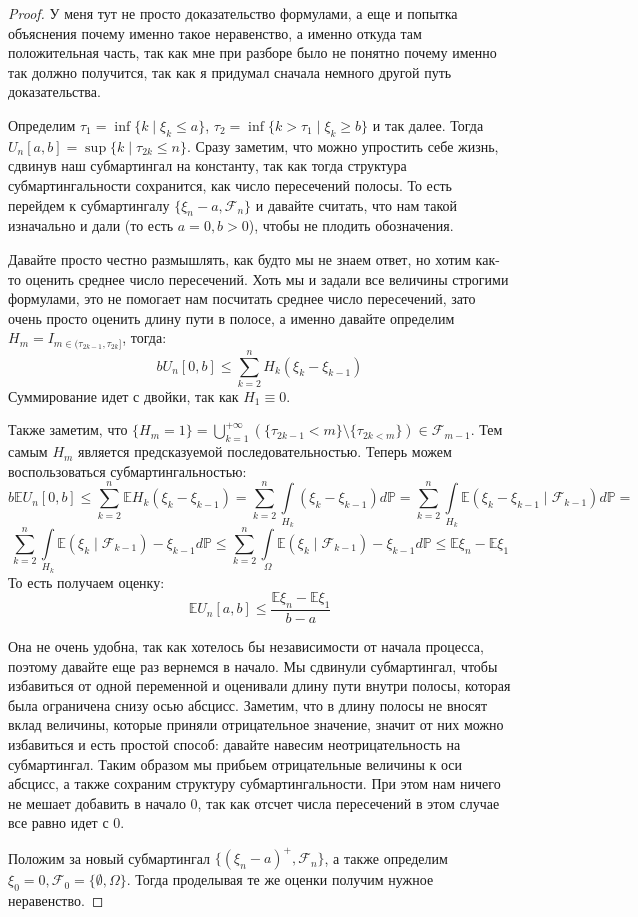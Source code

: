 \documentclass[12pt,a4paper]{article} %
\newcommand{\E}{\mathbb{E}}
\newcommand{\PR}{\mathbb{P}}
\newcommand{\F}{\mathcal{F}}
\begin{document}
	\begin{proof}
		У меня тут не просто доказательство формулами, а еще и попытка объяснения почему именно такое неравенство, а именно откуда там положительная часть, так как мне при разборе было не понятно почему именно так должно получится, так как я придумал сначала немного другой путь доказательства.
		
		Определим $\tau_1=\inf\{k\mid\xi_k\leq a\}$, $\tau_2=\inf\{k>\tau_1\mid\xi_k\geq b\}$ и так далее. Тогда $U_n[a,b]=\sup\{k\mid\tau_{2k}\leq n\}$. Сразу заметим, что можно упростить себе жизнь, сдвинув наш субмартингал на константу, так как тогда структура субмартингальности сохранится, как  число пересечений полосы. То есть перейдем к субмартингалу $\{\xi_n-a,\F_n\}$ и давайте считать, что нам такой изначально и дали (то есть $a=0, b>0$), чтобы не плодить обозначения.
		
		Давайте просто честно размышлять, как будто мы не знаем ответ, но хотим как-то оценить среднее число пересечений. Хоть мы и задали все величины строгими формулами, это не помогает нам посчитать среднее число пересечений, зато очень просто оценить длину пути в полосе, а именно давайте определим $H_m=I_{m\in(\tau_{2k-1},\tau_{2k}]}$, тогда:
		$$bU_n[0,b]\leq\sum_{k=2}^nH_k(\xi_k-\xi_{k-1})$$
		Суммирование идет с двойки, так как $H_1\equiv0$.
		
		Также заметим, что $\{H_m=1\}=\bigcup_{k=1}^{+\infty}(\{\tau_{2k-1}<m\}\setminus\{\tau_{2k<m}\})\in\F_{m-1}$. Тем самым $H_m$ является предсказуемой последовательностью. Теперь можем воспользоваться субмартингальностью:
		$$b\E U_n[0,b]\leq\sum_{k=2}^n\E H_k(\xi_k-\xi_{k-1})=\sum_{k=2}^n\int\limits_{H_k}(\xi_k-\xi_{k-1})d\PR=\sum_{k=2}^n\int\limits_{H_k}\E(\xi_k-\xi_{k-1}\mid\F_{k-1})d\PR=$$
		$$\sum_{k=2}^n\int\limits_{H_k}\E(\xi_k\mid\F_{k-1})-\xi_{k-1}d\PR\leq\sum_{k=2}^n\int\limits_{\Omega}\E(\xi_k\mid\F_{k-1})-\xi_{k-1}d\PR\leq\E\xi_n-\E\xi_1$$
		То есть получаем оценку:
		$$\E U_n[a,b]\leq\frac{\E\xi_n-\E\xi_1}{b-a}$$
		
		Она не очень удобна, так как хотелось бы независимости от начала процесса, поэтому давайте еще раз вернемся в начало. Мы сдвинули субмартингал, чтобы избавиться от одной переменной и оценивали длину пути внутри полосы, которая была ограничена снизу осью абсцисс. Заметим, что в длину полосы не вносят вклад величины, которые приняли отрицательное значение, значит от них можно избавиться и есть простой способ: давайте навесим неотрицательность на субмартингал. Таким образом мы прибьем отрицательные величины к оси абсцисс, а также сохраним структуру субмартингальности. При этом нам ничего не мешает добавить в начало 0, так как отсчет числа пересечений в этом случае все равно идет с 0.
		
		Положим за новый субмартингал $\{(\xi_n-a)^{+},\F_n\}$, а также определим $\xi_0=0, \F_0=\{\emptyset,\Omega\}$. Тогда проделывая те же оценки получим нужное неравенство.
	\end{proof}
\end{document}
